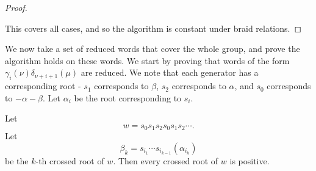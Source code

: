 \documentclass[11pt]{article}
\begin{document}
\begin{proof}
\begin{enumerate}[(i)]
\begin{enumerate}
        
        \end{enumerate}
    \end{enumerate}
    This covers all cases, and so the algorithm is constant under braid relations. 
\end{proof}

We now take a set of reduced words that cover the whole group, and prove the algorithm holds on these words. We start by proving that words of the form $\gamma_i(\nu)\delta_{\nu+i+1}(\mu)$ are reduced. We note that each generator has a corresponding root - $s_1$ corresponds to $\beta$, $s_2$ corresponds to $\alpha$, and $s_0$ corresponds to $-\alpha-\beta$. Let $\alpha_i$ be the root corresponding to $s_i$. 

\begin{lemma}\label{beforeturn}
Let
\[
w=s_0s_1s_2s_0s_1s_2\cdots.
\]
Let
\[
\beta_k=s_{i_1}\cdots s_{i_{k-1}}(\alpha_{i_k})
\]
be the $k$-th crossed root of $w$. Then every crossed root of $w$ is positive.
\end{lemma}
\end{document}
